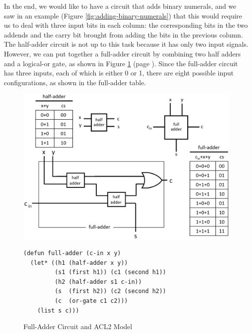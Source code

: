 In the end, we would like to have a circuit
that adds binary numerals,
and we saw in an example (Figure \ref{fig:adding-binary-numerals})
that this would require us to deal with three input bits
in each column:
the corresponding bits in the two addends
and the carry bit brought from adding
the bits in the previous column.
The half-adder circuit is not up to this task
because it has only two input signals.
However, we can put together a full-adder circuit
by combining two half adders and a logical-or gate,
as shown in Figure \ref{fig:full-adder}
(page \pageref{fig:full-adder}).
Since the full-adder circuit has three inputs,
each of which is either 0 or 1,
there are eight possible input configurations,
as shown in the full-adder table.

\begin{figure}
\begin{center}
\includegraphics[scale=0.25]{Images/full-adder.png}
\begin{Verbatim}
(defun full-adder (c-in x y)
  (let* ((h1 (half-adder x y))
         (s1 (first h1)) (c1 (second h1))
         (h2 (half-adder s1 c-in))
         (s  (first h2)) (c2 (second h2))
         (c  (or-gate c1 c2)))
    (list s c)))
\end{Verbatim}
\end{center}
\caption{Full-Adder Circuit and ACL2 Model}
\label{fig:full-adder}
\end{figure}

